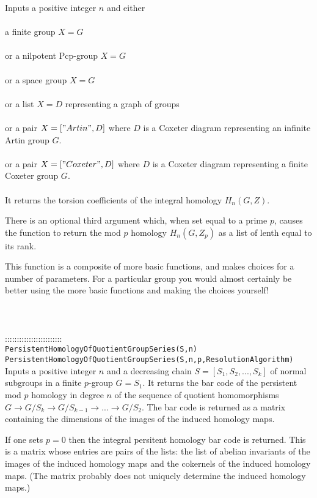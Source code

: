 \documentclass[a4paper,11pt]{report}
\begin{document}
{ Inputs a positive integer $n$ and either \\
 \\
 a finite group $X=G$ \\
 \\
 or a nilpotent Pcp-group $X=G$ \\
 \\
 or a space group $X=G$ \\
 \\
 or a list $X=D$ representing a graph of groups\\
 \\
or a pair $X=["Artin",D]$ where $D$ is a Coxeter diagram representing an infinite Artin group $G$.\\
 \\
or a pair $X=["Coxeter",D]$ where $D$ is a Coxeter diagram representing a finite Coxeter group $G$.\\
 \\
 It returns the torsion coefficients of the integral homology $H_n(G,Z)$. 

 There is an optional third argument which, when set equal to a prime $p$, causes the function to return the mod $p$ homology $H_n(G,Z_p)$ as a list of lenth equal to its rank. 

 This function is a composite of more basic functions, and makes choices for a
number of parameters. For a particular group you would almost certainly be
better using the more basic functions and making the choices yourself! \\
 \\
 \\
 \\
 ::::::::::::::::::::::::\\
 \texttt{PersistentHomologyOfQuotientGroupSeries(S,n)}\\
 \texttt{PersistentHomologyOfQuotientGroupSeries(S,n,p,Resolution{\textunderscore}Algorithm)}\\
 

 Inputs a positive integer $n$ and a decreasing chain $S=[S_1, S_2, ..., S_k]$ of normal subgroups in a finite $p$-group $G=S_1$. It returns the bar code of the persistent mod $p$ homology in degree $n$ of the sequence of quotient homomorphisms $G \rightarrow G/S_k \rightarrow G/S_{k-1} \rightarrow ... \rightarrow G/S_2 $. The bar code is returned as a matrix containing the dimensions of the images
of the induced homology maps. 

 If one sets $p=0$ then the integral persitent homology bar code is returned. This is a matrix
whose entries are pairs of the lists: the list of abelian invariants of the
images of the induced homology maps and the cokernels of the induced homology
maps. (The matrix probably does not uniquely determine the induced homology
maps.) 

}
\end{document}
